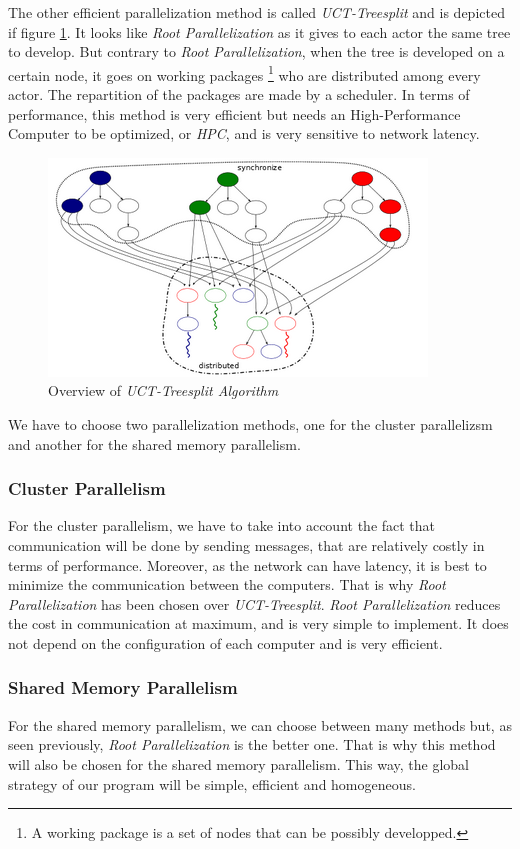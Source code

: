 The other efficient parallelization method is called \textit{UCT-Treesplit} and is depicted if figure \ref{fig:treesplit}. It looks like \textit{Root Parallelization} as it gives to each actor the same tree to develop.
But contrary to \textit{Root Parallelization}, when the tree is developed on a certain node, it goes on working packages \footnote{A working package is a set of nodes that can be possibly developped.} who are distributed among every actor. The repartition of the packages are made by a scheduler.
In terms of performance, this method is very efficient but needs an High-Performance Computer to be optimized, or \emph{HPC}, and is very sensitive to network latency.

\begin{figure}[!ht] 
\centerline{\includegraphics[scale=0.80]{3Methods/3.1Parallelization_Method/treesplit.png}}
   \caption{Overview of \textit{UCT-Treesplit Algorithm} \cite{treesplit}}
\label{fig:treesplit}
\end{figure}


We have to choose two parallelization methods, one for the cluster parallelizsm and another for the shared memory parallelism.
\subsubsection{Cluster Parallelism}
For the cluster parallelism, we have to take into account the fact that communication will be done by sending messages, that are relatively costly in terms of performance.
Moreover, as the network can have latency, it is best to minimize the communication between the computers. That is why \textit{Root Parallelization} has been chosen over \textit{UCT-Treesplit}.
\textit{Root Parallelization} reduces the cost in communication at maximum, and  is very simple to implement. It does not depend on the configuration of each computer and is very efficient\cite{parallel_comp}.

\subsubsection{Shared Memory Parallelism}
For the shared memory parallelism, we can choose between many methods but, as seen previously, \textit{Root Parallelization} is the better one\cite{parallel_comp}.
That is why this method will also be chosen for the shared memory parallelism. This way, the global strategy of our program will be simple, efficient and homogeneous.
